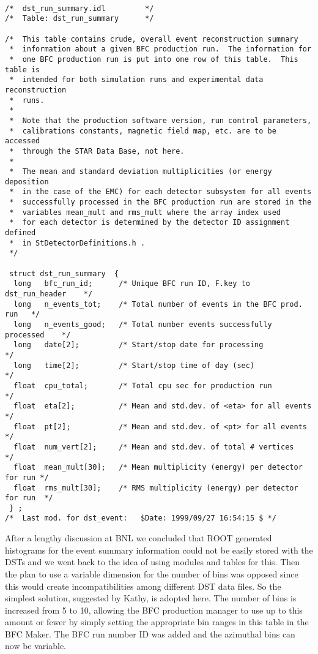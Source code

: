 \begin{verbatim}

/*  dst_run_summary.idl         */  
/*  Table: dst_run_summary      */  

/*  This table contains crude, overall event reconstruction summary
 *  information about a given BFC production run.  The information for
 *  one BFC production run is put into one row of this table.  This table is
 *  intended for both simulation runs and experimental data reconstruction
 *  runs.
 *
 *  Note that the production software version, run control parameters,
 *  calibrations constants, magnetic field map, etc. are to be accessed
 *  through the STAR Data Base, not here.
 *
 *  The mean and standard deviation multiplicities (or energy deposition
 *  in the case of the EMC) for each detector subsystem for all events
 *  successfully processed in the BFC production run are stored in the
 *  variables mean_mult and rms_mult where the array index used
 *  for each detector is determined by the detector ID assignment defined
 *  in StDetectorDefinitions.h .
 */

 struct dst_run_summary  {
  long   bfc_run_id;      /* Unique BFC run ID, F.key to dst_run_header    */
  long   n_events_tot;    /* Total number of events in the BFC prod. run   */
  long   n_events_good;   /* Total number events successfully processed    */
  long   date[2];         /* Start/stop date for processing                */
  long   time[2];         /* Start/stop time of day (sec)                  */
  float  cpu_total;       /* Total cpu sec for production run              */
  float  eta[2];          /* Mean and std.dev. of <eta> for all events     */
  float  pt[2];           /* Mean and std.dev. of <pt> for all events      */
  float  num_vert[2];     /* Mean and std.dev. of total # vertices         */
  float  mean_mult[30];   /* Mean multiplicity (energy) per detector for run */ 
  float  rms_mult[30];    /* RMS multiplicity (energy) per detector for run  */
 } ;
/*  Last mod. for dst_event:   $Date: 1999/09/27 16:54:15 $ */

\end{verbatim}

\vspace{0.1in}
\vspace{0.05in}

After a lengthy discussion at BNL we concluded that ROOT generated histograms
for the event summary information could not be easily stored with the DSTs
and we went back to the idea of using modules and tables for this.  Then
the plan to use a variable dimension for the number of bins was opposed 
since this would create incompatibilities among different DST data files.
So the simplest solution, suggested by Kathy, is adopted here.  The number
of bins is increased from 5 to 10, allowing the BFC production manager
to use up to this amount or fewer by simply setting the appropriate bin
ranges in this table in the BFC Maker.  The BFC run number ID was added
and the azimuthal bins can now be variable.

